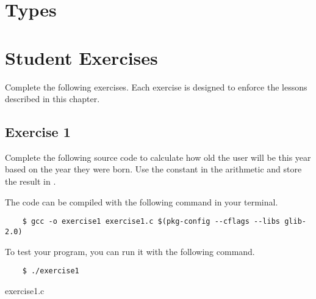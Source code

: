 \section{Types}


\section{Student Exercises}

Complete the following exercises. Each exercise is designed to enforce the
lessons described in this chapter.

\subsection{Exercise 1}

Complete the following source code to calculate how old the user will be this
year based on the year they were born. Use the constant  in
the arithmetic and store the result in .

The code can be compiled with the following command in your terminal.

\begin{Verbatim}
    $ gcc -o exercise1 exercise1.c $(pkg-config --cflags --libs glib-2.0)
\end{Verbatim}

To test your program, you can run it with the following command.

\begin{Verbatim}
    $ ./exercise1
\end{Verbatim}

\begin{code}{exercise1.c}

\end{code}
